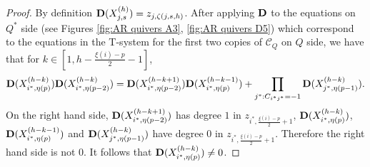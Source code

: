 \documentclass[12pt]{amsart}
\theoremstyle{plain}
\theoremstyle{definition}
\numberwithin{equation}{section}
\begin{document}
\begin{proof}
By definition ${\bf D}(X_{j,s}^{(h)})=z_{j,\zeta(j,s,h)}$. After applying ${\bf D}$ to the equations on $Q^*$ side (see Figures \ref{fig:AR quivers A3}, \ref{fig:AR quivers D5}) which correspond to the equations in the T-system for the first two copies of $\mathcal{C}_Q$ on $Q$ side, we have that for $k \in [1,h - \frac{\xi(i)-p}{2} - 1]$,
\begin{align} \label{eq:apply bD to T-system on Qstar side which correspond to first two copies of CQ on Q side}
{\bf D}(X_{i^*, \eta(p)}^{(h-k)}) {\bf D}(X_{i^*, \eta(p-2)}^{(h-k)}) = {\bf D}(X_{i^*, \eta(p-2)}^{(h-k+1)}) {\bf D}(X_{i^*, \eta(p)}^{(h-k-1)}) + \prod_{j^*:C_{i^*j^*}=-1} {\bf D}(X_{j^*, \eta(p-1)}^{(h-k)}).  
\end{align}
On the right hand side, ${\bf D}(X_{i^*, \eta(p-2)}^{(h-k+1)})$ has degree $1$ in $z_{i^*, \frac{\xi(i)-p}{2}+1}$, ${\bf D}(X_{i^*, \eta(p)}^{(h-k)})$, ${\bf D}(X_{i^*, \eta(p)}^{(h-k-1)})$ and ${\bf D}(X_{j^*, \eta(p-1)}^{(h-k)})$ have degree $0$ in $z_{i^*, \frac{\xi(i)-p}{2}+1}$. Therefore the right hand side is not $0$. It follows that ${\bf D}(X_{i^*, \eta(p)}^{(h-k)}) \ne 0$.


\end{proof}
\end{document}
